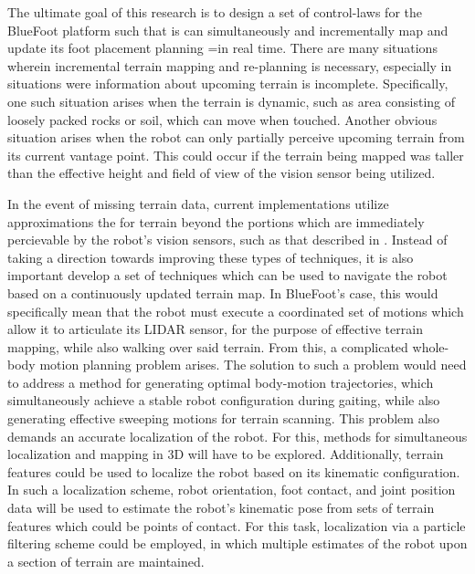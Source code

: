 The ultimate goal of this research is to design a set of control-laws for the BlueFoot platform such that is can simultaneously and incrementally map and update its foot placement planning =in real time. There are many situations wherein incremental terrain mapping and re-planning is necessary, especially in situations were information about upcoming terrain is incomplete. Specifically, one such situation arises when the terrain is dynamic, such as area consisting of loosely packed rocks or soil, which can move when touched. Another obvious situation arises when the robot can only partially perceive upcoming terrain from its current vantage point. This could occur if the terrain being mapped was taller than the effective height and field of view of the vision sensor being utilized.

In the event of missing terrain data, current implementations utilize approximations the for terrain beyond the portions which are immediately percievable by the robot's vision sensors, such as that described in \cite{Kolter2009}. Instead of taking a direction towards improving these types of techniques, it is also important develop a set of techniques which can be used to navigate the robot based on a continuously updated terrain map. In BlueFoot's case, this would specifically mean that the robot must execute a coordinated set of motions which allow it to articulate its LIDAR sensor, for the purpose of effective terrain mapping, while also walking over said terrain. From this, a complicated whole-body motion planning problem arises. The solution to such a problem would need to address a method for generating optimal body-motion trajectories, which simultaneously achieve a stable robot configuration during gaiting, while also generating effective sweeping motions for terrain scanning. This problem also demands an accurate localization of the robot. For this, methods for simultaneous localization and mapping in 3D will have to be explored. Additionally, terrain features could be used to localize the robot based on its kinematic configuration. In such a localization scheme, robot orientation, foot contact, and joint position data will be used to estimate the robot's kinematic pose from sets of terrain features which could be points of contact. For this task, localization via a particle filtering scheme could be employed, in which multiple estimates of the robot upon a section of terrain are maintained.

